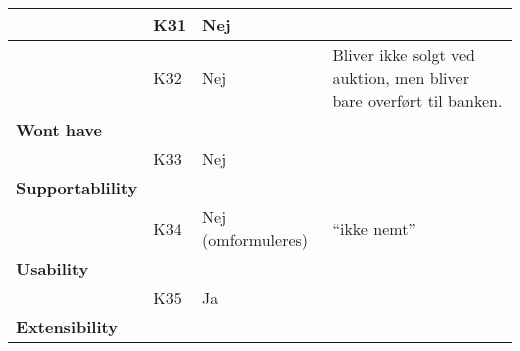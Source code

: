 \documentclass[class=article, crop=false]{standalone}
\begin{document}
\begin{table}[H]
\begin{tabularx}{\textwidth}{|l|l|l|X|}
            & K31      & Nej                &                                                                                                                                                                                                    \\ \hline
            & K32      & Nej                & Bliver ikke solgt ved auktion, men bliver bare overført til banken.                                                                                                                                \\ \hline
            \textbf{Wont have}       &          &                    &                                                                                                                                                                                                    \\ \hline
            & K33      & Nej                &                                                                                                                                                                                                    \\ \hline
            \textbf{Supportablility} &          &                    &                                                                                                                                                                                                    \\ \hline
            & K34      & Nej (omformuleres) & “ikke nemt”                                                                                                                                                                                        \\ \hline
            \textbf{Usability       }&          &                    &                                                                                                                                                                                                    \\ \hline
            & K35      & Ja                 &                                                                                                                                                                                                    \\ \hline
            \textbf{Extensibility   }&          &                    &                                                                                                                                                                                                    \\ \hline

\end{tabularx}
\end{table}
\end{document}
